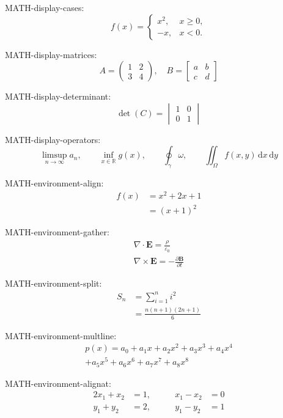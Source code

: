 \documentclass[a4paper]{article}
\begin{document}
MATH-display-cases:
\[
  f(x)=
  \begin{cases}
    x^2, & x\ge 0, \\
    -x,  & x<0.
  \end{cases}
\]

MATH-display-matrices:
\[
  A=
  \begin{pmatrix}
    1 & 2 \\
    3 & 4
  \end{pmatrix}
  ,
  \quad
  B=
  \begin{bmatrix}
    a & b \\
    c & d
  \end{bmatrix}
\]

MATH-display-determinant:
\[
  \det(C)=
  \begin{vmatrix}
    1 & 0 \\
    0 & 1
  \end{vmatrix}
\]

MATH-display-operators:
\[
  \limsup_{n\to\infty} a_n,\qquad
  \inf_{x\in\mathbb{R}} g(x),\qquad
  \oint_{\gamma}\omega,\qquad
  \iint_{\Omega} f(x,y)\,\mathrm{d}x\,\mathrm{d}y
\]

MATH-environment-align:
\begin{align}
  f(x) & = x^2 + 2x + 1 \\
       & = (x+1)^2
\end{align}

MATH-environment-gather:
\begin{gather}
  \nabla\cdot\mathbf{E}=\frac{\rho}{\varepsilon_0} \\
  \nabla\times\mathbf{E}=-\frac{\partial \mathbf{B}}{\partial t}
\end{gather}

MATH-environment-split:
\begin{equation}
  \begin{split}
    S_n & = \sum_{i=1}^{n} i^2     \\
        & = \frac{n(n+1)(2n+1)}{6}
  \end{split}
\end{equation}

MATH-environment-multline:
\begin{multline}
  p(x)=a_0+a_1x+a_2x^2+a_3x^3+a_4x^4 \\
  +a_5x^5+a_6x^6+a_7x^7+a_8x^8
\end{multline}

MATH-environment-alignat:
\begin{alignat}{2}
  x_1+x_2 & = 1, & \qquad x_1-x_2 & = 0 \\
  y_1+y_2 & = 2, & \qquad y_1-y_2 & = 1
\end{alignat}
\end{document}

